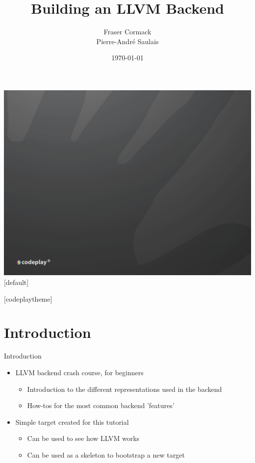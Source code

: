 \documentclass[t]{beamer}
\title{Building an LLVM Backend}
\subtitle{}
\author{Fraser Cormack \\ Pierre-André Saulais}
\institute{Codeplay Software \\ @codeplaysoft}
\date{\today}
\begin{document}
{\includegraphics[width=\paperwidth,height=\paperheight]{dark_background_title.png}}
[default]

\begin{frame}
  \vspace{4ex}
  \titlepage
\end{frame}


[codeplaytheme]

\section*{Introduction}

\begin{frame}{Introduction}

\begin{itemize}
    \item LLVM backend crash course, for beginners
    \begin{itemize}
        \item Introduction to the different representations used in the backend
        \item How-tos for the most common backend 'features'
    \end{itemize}  
    \item Simple target created for this tutorial
    \begin{itemize}
        \item Can be used to see how LLVM works
        \item Can be used as a skeleton to bootstrap a new target
    \end{itemize}
\end{itemize}

\end{frame}
\end{document}
